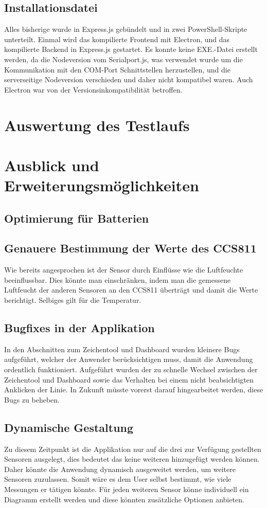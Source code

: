 \documentclass[]{article}
\begin{document}
			\subsection{Installationsdatei}
			Alles bisherige wurde in Express.js gebündelt und in zwei PowerShell-Skripte unterteilt. Einmal wird das kompilierte Frontend mit Electron, und das kompilierte Backend in Express.js gestartet.
			Es konnte keine EXE.-Datei erstellt werden, da die Nodeversion vom Serialport.js, was verwendet wurde um die Kommunikation mit den COM-Port Schnittstellen herzustellen, und die serverseitige Nodeversion verschieden und daher nicht kompatibel waren. Auch Electron war von der Versionsinkompatibilität betroffen. 
			
	\section{Auswertung des Testlaufs}
			
	\section{Ausblick und Erweiterungsmöglichkeiten}
		\subsection{Optimierung für Batterien}
		\subsection{Genauere Bestimmung der Werte des CCS811}
			Wie bereits angesprochen ist der Sensor durch Einflüsse wie die Luftfeuchte beeinflussbar. Dies könnte man einschränken, indem man die gemessene Luftfeucht  der anderen Sensoren an den CCS811 überträgt und damit die Werte berichtigt. Selbiges gilt für die Temperatur. 
		
		\subsection{Bugfixes in der Applikation}
			In den Abschnitten zum Zeichentool und Dashboard wurden kleinere Bugs aufgeführt, welcher der Anwender berücksichtigen muss, damit die Anwendung ordentlich funktioniert. Aufgeführt wurden der zu schnelle Wechsel zwischen der Zeichentool und Dashboard sowie das Verhalten bei einem nicht beabsichtigten Anklicken der Linie. In Zukunft müsste vorerst darauf hingearbeitet werden, diese Bugs zu beheben. 
			
		\subsection{Dynamische Gestaltung}
			Zu diesem Zeitpunkt ist die Applikation nur auf die drei zur Verfügung gestellten Sensoren ausgelegt, dies bedeutet das keine weiteren hinzugefügt werden können. Daher könnte die Anwendung dynamisch ausgeweitet werden, um weitere Sensoren zuzulassen. Somit wäre es dem User selbst bestimmt, wie viele Messungen er tätigen könnte. Für jeden weiteren Sensor könne individuell ein Diagramm erstellt werden und diese könnten zusätzliche Optionen anbieten. 
					
\end{document}
